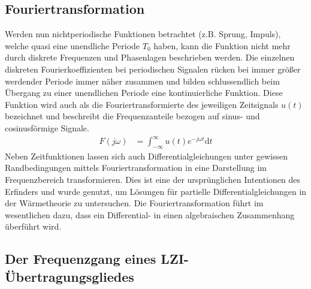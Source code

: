 \subsection{Fouriertransformation}
%
Werden nun nichtperiodische Funktionen betrachtet (z.B. Sprung, Impuls), welche quasi eine unendliche Periode $T_{0}$ haben, kann die Funktion nicht mehr durch diskrete Frequenzen und Phasenlagen beschrieben werden. Die einzelnen diskreten Fourierkoeffizienten bei periodischen Signalen rücken bei immer größer werdender Periode immer näher zusammen und bilden schlussendlich beim Übergang zu einer unendlichen Periode eine kontinuierliche Funktion. Diese Funktion wird auch als die Fouriertransformierte des jeweiligen Zeitsignals $u(t)$ bezeichnet und beschreibt die Frequenzanteile bezogen auf sinus- und cosinusförmige Signale.
%
\begin{equation*}
\begin{aligned}
F(j\omega)&=\int_{-\infty}^{\infty}u(t)e^{-j\omega t}\text{d}t 
\end{aligned}
\end{equation*} 
%
Neben Zeitfunktionen lassen sich auch Differentialgleichungen unter gewissen Randbedingungen mittels Fouriertransformation in eine Darstellung im Frequenzbereich transformieren. Dies ist eine der ursprünglichen Intentionen des Erfinders und wurde genutzt, um Lösungen für partielle Differentialgleichungen in der Wärmetheorie zu untersuchen. Die Fouriertransformation führt im wesentlichen dazu, dass ein Differential- in einen algebraischen Zusammenhang überführt wird. 
%
%
\subsection{Der Frequenzgang eines LZI-Übertragungsgliedes} 
%
